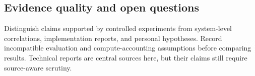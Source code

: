 \subsection{Evidence quality and open questions}
Distinguish claims supported by controlled experiments from system-level correlations,
implementation reports, and personal hypotheses. Record incompatible evaluation and
compute-accounting assumptions before comparing results. Technical reports are central
sources here, but their claims still require source-aware scrutiny.
